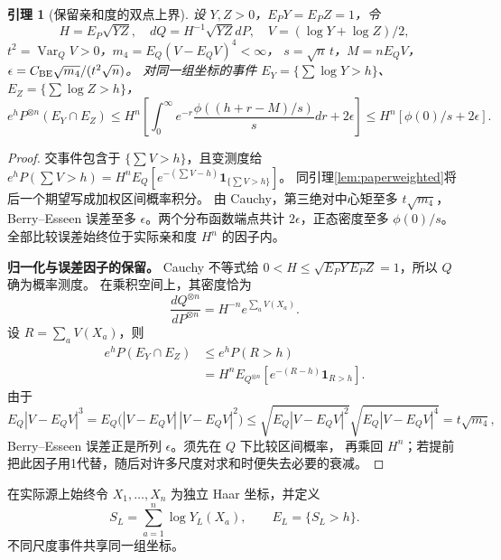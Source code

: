 \documentclass[UTF8,a4paper,11pt,fontset=fandol]{ctexart}
\newtheorem{lemma}{引理}[section]
\theoremstyle{remark}
\begin{document}
\begin{lemma}[保留亲和度的双点上界]\label{lem:paperpair}
设 $Y,Z>0$，$E_PY=E_PZ=1$，令
\[
 H=E_P\sqrt{YZ},\quad dQ=H^{-1}\sqrt{YZ}dP,
 \quad V=(\log Y+\log Z)/2,
\]
$t^2=\operatorname{Var}_QV>0$，$m_4=E_Q(V-E_QV)^4<\infty$，
$s=\sqrt n\,t$，$M=nE_QV$，$\epsilon=C_{\rm BE}\sqrt{m_4}/(t^2\sqrt n)$。
对同一组坐标的事件 $E_Y=\{\sum\log Y>h\}$、$E_Z=\{\sum\log Z>h\}$，
\[
 e^hP^{\otimes n}(E_Y\cap E_Z)
 \le H^n\left[\int_0^\infty e^{-r}\frac{\phi((h+r-M)/s)}s dr+2\epsilon\right]
 \le H^n[\phi(0)/s+2\epsilon].
\]
\end{lemma}
\begin{proof}
交事件包含于 $\{\sum V>h\}$，且变测度给
$e^hP(\sum V>h)=H^nE_Q[e^{-(\sum V-h)}\mathbf1_{\{\sum V>h\}}]$。
同引理\ref{lem:paperweighted}将后一个期望写成加权区间概率积分。
由 Cauchy，第三绝对中心矩至多 $t\sqrt{m_4}$，Berry--Esseen 误差至多
$\epsilon$。两个分布函数端点共计 $2\epsilon$，正态密度至多 $\phi(0)/s$。
全部比较误差始终位于实际亲和度 $H^n$ 的因子内。

\medskip\noindent\textbf{归一化与误差因子的保留。}
Cauchy 不等式给 $0<H\le\sqrt{E_PY\,E_PZ}=1$，所以 $Q$ 确为概率测度。
在乘积空间上，其密度恰为
\[
 \frac{dQ^{\otimes n}}{dP^{\otimes n}}=H^{-n}e^{\sum_aV(X_a)}.
\]
设 $R=\sum_aV(X_a)$，则
\begin{align*}
 e^hP(E_Y\cap E_Z)
 &\le e^hP(R>h)\\
 &=H^nE_{Q^{\otimes n}}[e^{-(R-h)}\mathbf1_{R>h}].
\end{align*}
由于
\[
 E_Q|V-E_QV|^3
 =E_Q\bigl(|V-E_QV|\,|V-E_QV|^2\bigr)
 \le\sqrt{E_Q|V-E_QV|^2}\sqrt{E_Q|V-E_QV|^4}
 =t\sqrt{m_4},
\]
Berry--Esseen 误差正是所列 $\epsilon$。须先在 $Q$ 下比较区间概率，
再乘回 $H^n$；若提前把此因子用1代替，随后对许多尺度对求和时便失去必要的衰减。

\end{proof}

在实际源上始终令 $X_1,\ldots,X_n$ 为独立 Haar 坐标，并定义
\[
 S_L=\sum_{a=1}^n\log Y_L(X_a),\qquad E_L=\{S_L>h\}.
\]
不同尺度事件共享同一组坐标。
\end{document}
